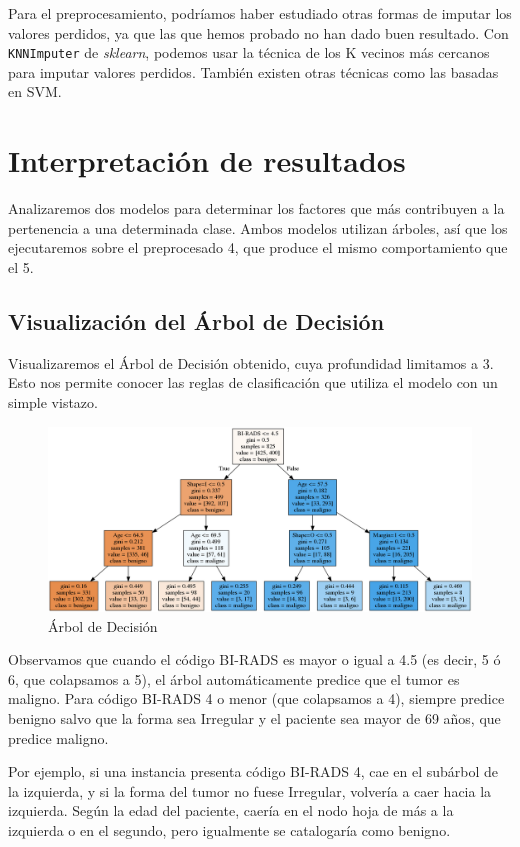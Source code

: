 \documentclass{article}
\begin{document}
Para el preprocesamiento, podríamos haber estudiado otras formas de
imputar los valores perdidos, ya que las que hemos probado no han dado
buen resultado. Con \texttt{KNNImputer} de \textit{sklearn}, podemos
usar la técnica de los K vecinos más cercanos para imputar valores
perdidos. También existen otras técnicas como las basadas en SVM.

\section{Interpretación de resultados} \label{sec:interpretacion}

Analizaremos dos modelos para determinar los factores que más
contribuyen a la pertenencia a una determinada clase. Ambos modelos
utilizan árboles, así que los ejecutaremos sobre el preprocesado 4,
que produce el mismo comportamiento que el 5.

\subsection{Visualización del Árbol de Decisión}
Visualizaremos el Árbol de Decisión obtenido, cuya profundidad
limitamos a 3. Esto nos permite conocer las reglas de clasificación
que utiliza el modelo con un simple vistazo.

\begin{figure}[H]
  \centering
  \includegraphics[width=190mm]{figures/tree}
  \caption{Árbol de Decisión}
  \label{fig:tree}
\end{figure}

Observamos que cuando el código BI-RADS es mayor o igual a 4.5 (es
decir, 5 ó 6, que colapsamos a 5), el árbol automáticamente predice
que el tumor es maligno. Para código BI-RADS 4 o menor (que colapsamos
a 4), siempre predice benigno salvo que la forma sea Irregular y el
paciente sea mayor de 69 años, que predice maligno.

Por ejemplo, si una instancia presenta código BI-RADS 4, cae en el
subárbol de la izquierda, y si la forma del tumor no fuese Irregular,
volvería a caer hacia la izquierda. Según la edad del paciente, caería
en el nodo hoja de más a la izquierda o en el segundo, pero igualmente
se catalogaría como benigno.
\end{document}
